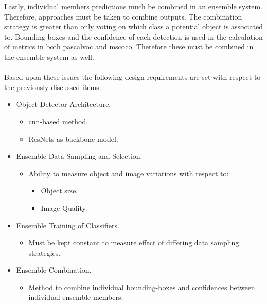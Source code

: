Lastly, individual members predictions much be combined in an ensemble system. Therefore, approaches must be taken to combine outputs. The combination strategy is greater than only voting on which class a potential object is associated to. Bounding-boxes and the confidence of each detection is used in the calculation of metrics in both \gls{pascalvoc} and \gls{mscoco}. Therefore these must be combined in the ensemble system as well.
\\\\
Based upon these issues the following design requirements are set with respect to the previously discussed items.

\begin{itemize}
	
	\item Object Detector Architecture.
	\begin{itemize}
		\item \gls{cnn}-based method.
		\item ResNets as backbone model.
	\end{itemize}

	\item Ensemble Data Sampling and Selection.
	\begin{itemize}
		\item Ability to measure object and image variations with respect to: 
		\begin{itemize}
			\item Object size.
			\item Image Quality.
		\end{itemize}
	\end{itemize}

	\item Ensemble Training of Classifiers.
	\begin{itemize}
		\item Must be kept constant to measure effect of differing data sampling strategies.
	\end{itemize}

	\item Ensemble Combination.
	\begin{itemize}
		\item Method to combine individual bounding-boxes and confidences between individual ensemble members.
	\end{itemize}
\end{itemize}
